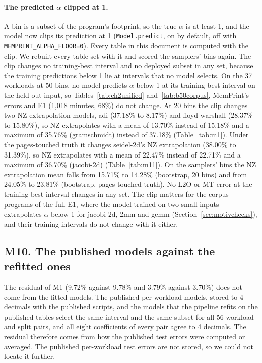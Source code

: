 \documentclass[11pt]{article}
\newcommand{\memprint}{MemPrint}
\begin{document}
\paragraph{The predicted $\alpha$ clipped at 1.} A bin is a subset of the program's footprint, so the true $\alpha$
is at least 1, and the model now clips its prediction at 1 (\texttt{Model.predict}, on by default, off with
\texttt{MEMPRINT\_ALPHA\_FLOOR=0}). Every table in this document is computed with the clip. We rebuilt every table
set with it and scored the samplers' bins again. The clip changes no training-best interval and no deployed subset
in any set, because the training predictions below 1 lie at intervals that no model selects. On the 37 workloads at
50 bins, no model predicts $\alpha$ below 1 at its training-best interval on the held-out input, so
Tables~\ref{tab:ch2unified} and~\ref{tab:b50corpus}, \memprint{}'s errors and E1 (1{,}018 minutes, 68\%) do not
change. At 20 bins the clip changes two NZ extrapolation models, adi (37.18\% to 8.17\%) and floyd-warshall (28.37\%
to 15.80\%), so NZ extrapolates with a mean of 13.70\% instead of 15.18\% and a maximum of 35.76\% (gramschmidt)
instead of 37.18\% (Table~\ref{tab:m1}). Under the pages-touched truth it changes seidel-2d's NZ extrapolation
(38.00\% to 31.39\%), so NZ extrapolates with a mean of 22.47\% instead of 22.71\% and a maximum of 36.70\% (jacobi-2d)
(Table~\ref{tab:m11}). On the samplers' bins the NZ extrapolation mean falls from 15.71\% to 14.28\% (bootstrap,
20 bins) and from 24.05\% to 23.81\% (bootstrap, pages-touched truth). No L2O or MT error at the training-best
interval changes in any set. The clip matters for the corpus programs of the full E1, where the model trained on two
small inputs extrapolates $\alpha$ below 1 for jacobi-2d, 2mm and gemm (Section~\ref{sec:motivchecks}), and their training
intervals do not change with it either.

\subsection{M10. The published models against the refitted ones}
\label{sec:m10}

The residual of M1 (9.72\% against 9.78\% and 3.79\% against 3.70\%) does not come from the fitted models. The
published per-workload models, stored to 4 decimals with the published scripts, and the models that the pipeline refits on the published tables select the same interval and the
same subset for all 56 workload and split pairs, and all eight coefficients of every pair agree to 4 decimals. The
residual therefore comes from how the published test errors were computed or averaged. The published per-workload
test errors are not stored, so we could not locate it further.
\end{document}

